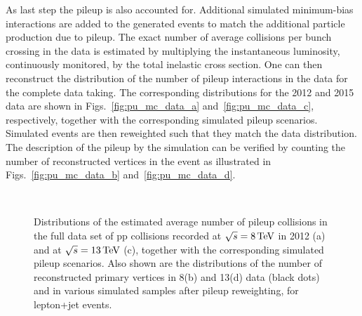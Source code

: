 As last step the pileup is also accounted for.
Additional simulated minimum-bias interactions are added to the generated events to match the additional particle production due to pileup.
The exact number of average collisions per bunch crossing in the data is estimated by multiplying the instantaneous luminosity, continuously monitored, by the total inelastic cross section.
One can then reconstruct the distribution of the number of pileup interactions in the data for the complete data taking.
The corresponding distributions for the 2012 and 2015 data are shown in Figs.~\ref{fig:pu_mc_data_a} and~\ref{fig:pu_mc_data_c}, respectively, together with the corresponding simulated pileup scenarios.
Simulated events are then reweighted such that they match the data distribution. The description of the pileup by the simulation can be verified by counting the number of reconstructed vertices in the event as illustrated in Figs.~\ref{fig:pu_mc_data_b} and~\ref{fig:pu_mc_data_d}.\\

\begin{figure}[!htb]
\centering
{}
\\
\caption{Distributions of the estimated average number of pileup collisions in the full data set of pp collisions recorded at $\sqrt{s} = 8\,\text{Te\hspace{-.08em}V}$ in 2012 (a) and at $\sqrt{s} = 13\,\text{Te\hspace{-.08em}V}$ (c), together with the corresponding simulated pileup scenarios. Also shown are the distributions of the number of reconstructed primary vertices in 8\TeV (b) and 13\TeV (d) data (black dots) and in various simulated samples after pileup reweighting, for lepton+jet events.}
\label{fig:pu_mc_data}
\end{figure}

